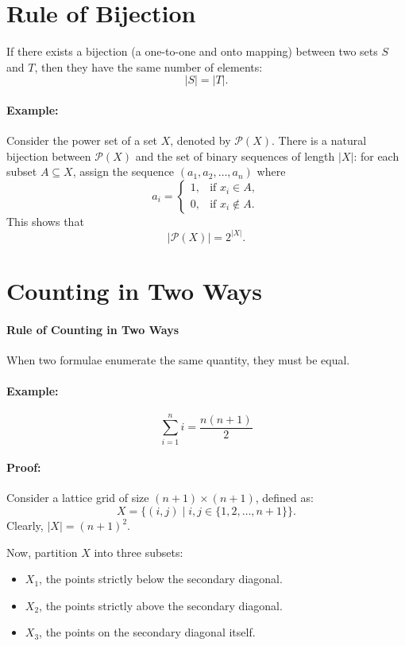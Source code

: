 \documentclass[docmute]{article}
\begin{document}
\section{Rule of Bijection}
If there exists a bijection (a one-to-one and onto mapping) between two sets $S$ and $T$, then they have the same number of elements:
\[
|S| = |T|.
\]

\paragraph{Example:}  
Consider the power set of a set $X$, denoted by $\mathcal{P}(X)$. There is a natural bijection between $\mathcal{P}(X)$ and the set of binary sequences of length $|X|$: for each subset $A \subseteq X$, assign the sequence $(a_1,a_2,\dots,a_n)$ where 
\[
a_i = \begin{cases} 
1, & \text{if } x_i \in A, \\
0, & \text{if } x_i \notin A.
\end{cases}
\]
This shows that 
\[
|\mathcal{P}(X)| = 2^{|X|}.
\]

\section{Counting in Two Ways}  

\paragraph{Rule of Counting in Two Ways}  
When two formulae enumerate the same quantity, they must be equal.  

\paragraph{Example:}  
\[
\sum_{i=1}^{n} i = \frac{n(n+1)}{2}
\]

\paragraph{Proof:}  
Consider a lattice grid of size \( (n+1) \times (n+1) \), defined as:  
\[
X = \{(i, j) \mid i, j \in \{1, 2, \dots, n+1\} \}.
\]  
Clearly, \( |X| = (n+1)^2 \).  

Now, partition \( X \) into three subsets:
\begin{itemize}[nosep]
  \item \( X_1 \), the points strictly below the secondary diagonal.
  \item \( X_2 \), the points strictly above the secondary diagonal.
  \item \( X_3 \), the points on the secondary diagonal itself.
\end{itemize}
\end{document}
